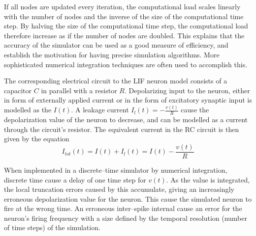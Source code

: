 	If all nodes are updated every iteration, the computational load scales linearly with the number of nodes and the inverse of the size of the computational time step.
	By halving the size of the computational time step, the computational load therefore increase as if the number of nodes are doubled.
	This explains that the accuracy of the simulator can be used as a good measure of efficiency, and establish the motivation for having precise simulation algorithms.
	More sophisticated numerical integration techniques are often used to accomplish this.





% 
% 
 

	The corresponding electrical circuit to the LIF neuron model consists of a capacitor $C$ in parallel with a resistor $R$. %
	Depolarizing input to the neuron, either in form of externally applied current or in the form of excitatory synaptic input is modelled as the $I(t)$. %
	A leakage current $I_l(t) = -\frac{v(t)}{R}$ cause the depolarization value of the neuron to decrease, and can be modelled as a current through the circuit's resistor. %
	The equivalent current in the RC circuit is then given by the equation
	\begin{equation}
		I_{tot}(t) = I(t) + I_l(t) = I(t) - \frac{v(t)}{R}
	\end{equation}
	
	When implemented in a discrete--time simulator by numerical integration, discrete time cause a delay of one time step for $v(t)$.
	As the value is integrated, the local truncation errors caused by this accumulate, giving an increasingly erroneous depolarization value for the neuron. 
	This cause the simulated neuron to fire at the wrong time.
	An erroneous inter--spike internal cause an error for the neuron's firing frequency with a size defined by the temporal resolution (number of time steps) of the simulation. %








		
